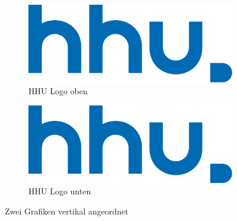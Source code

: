 \begin{figure}
  \centering
  \begin{subfigure}[b]{0.8\textwidth}
    \includegraphics[width=1.0\linewidth]{img/hhu}
    \caption{HHU Logo oben}
    \label{grafik_5}
  \end{subfigure}
  \begin{subfigure}[b]{0.8\textwidth}
    \includegraphics[width=1.0\linewidth]{img/hhu}
    \caption{HHU Logo unten}
    \label{grafik_6}
  \end{subfigure}
  \caption{Zwei Grafiken vertikal angeordnet}
  \label{zwei_grafiken_2}
\end{figure}
